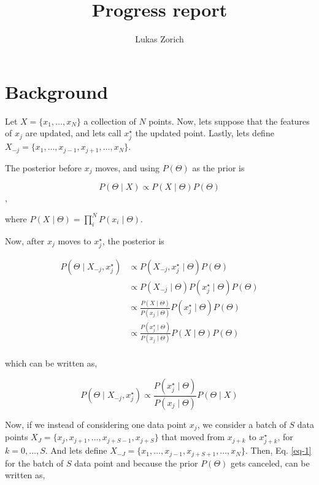 \documentclass{article}
\begin{document}
\title{Progress report}
\author{Lukas Zorich}

\maketitle

\section{Background}

Let $X = \{ x_1, \dotsc, x_N \}$ a collection of $N$ points. Now, lets suppose that the features of $x_j$ are updated, and lets call $x_j^{\star}$ the updated point. Lastly, lets define $X_{-j} = \{ x_1, \dotsc, x_{j-1}, x_{j+1}, \dotsc, x_N \}$.

The posterior before $x_j$ moves, and using $P(\Theta)$ as the prior is

$$P(\Theta \mid X) \propto P(X \mid \Theta)P(\Theta)$$,

where $P(X \mid \Theta) = \prod_i^N P(x_i \mid \Theta)$.

Now, after $x_j$ moves to $x_j^{\star}$, the posterior is

\begin{align*}
P(\Theta \mid X_{-j}, x_j^{\star}) &\propto P(X_{-j}, x_j^{\star} \mid \Theta)P(\Theta) \\
&\propto P(X_{-j} \mid \Theta)P(x_j^{\star} \mid \Theta)P(\Theta) \\
&\propto \frac{P(X \mid \Theta)}{P(x_j \mid \Theta)}P(x_j^{\star} \mid \Theta)P(\Theta) \\
&\propto \frac{P(x_j^{\star} \mid \Theta)}{P(x_j \mid \Theta)}P(X \mid \Theta)P(\Theta) \\
\end{align*}

which can be written as,

\begin{equation}
\label{eq-1}
P(\Theta \mid X_{-j}, x_j^{\star}) \propto \frac{P(x_j^{\star} \mid \Theta)}{P(x_j \mid \Theta)}P(\Theta \mid X)
\end{equation}

Now, if we instead of considering one data point $x_j$, we consider a batch
of $S$ data points $X_J = \{ x_j, x_{j+1}, \dotsc, x_{j + S - 1}, x_{j + S} \}$
that moved from $x_{j + k}$ to $x_{j + k}^{\star}$, for $k = 0, \dotsc, S$. And
lets define $X_{-J} = \{ x_1, \dotsc, x_{j-1}, x_{j + S + 1}, \dotsc, x_N \}$.
Then, Eq. \ref{eq-1} for the batch of $S$ data point and because the prior
$P(\Theta)$ gets canceled, can be written as,
\end{document}
